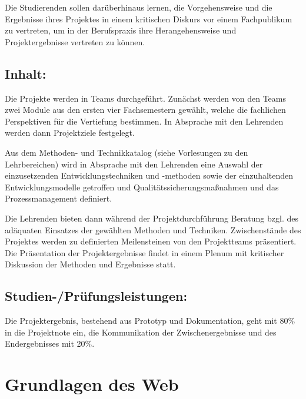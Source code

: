 Die Studierenden sollen darüberhinaus lernen, die Vorgehensweise und die
Ergebnisse ihres Projektes in einem kritischen Diskurs vor einem
Fachpublikum zu vertreten, um in der Berufspraxis ihre Herangehensweise
und Projektergebnisse vertreten zu können.

\section*{Inhalt:}\label{inhalt-10}

Die Projekte werden in Teams durchgeführt. Zunächst werden von den Teams
zwei Module aus den ersten vier Fachsemestern gewählt, welche die
fachlichen Perspektiven für die Vertiefung bestimmen. In Absprache mit
den Lehrenden werden dann Projektziele festgelegt.

Aus dem Methoden- und Technikkatalog (siehe Vorlesungen zu den
Lehrbereichen) wird in Absprache mit den Lehrenden eine Auswahl der
einzusetzenden Entwicklungstechniken und -methoden sowie der
einzuhaltenden Entwicklungsmodelle getroffen und
Qualitätssicherungsmaßnahmen und das Prozessmanagement definiert.

Die Lehrenden bieten dann während der Projektdurchführung Beratung bzgl.
des adäquaten Einsatzes der gewählten Methoden und Techniken.
Zwischenstände des Projektes werden zu definierten Meilensteinen von den
Projektteams präsentiert. Die Präsentation der Projektergebnisse findet
in einem Plenum mit kritischer Diskussion der Methoden und Ergebnisse
statt.

\section*{Studien-/Prüfungsleistungen:}\label{studien-pruxfcfungsleistungen-9}

Die Projektergebnis, bestehend aus Prototyp und Dokumentation, geht mit
80\% in die Projektnote ein, die Kommunikation der Zwischenergebnisse
und des Endergebnisses mit 20\%.

\chapter{Grundlagen des Web}\label{grundlagen-des-web}

